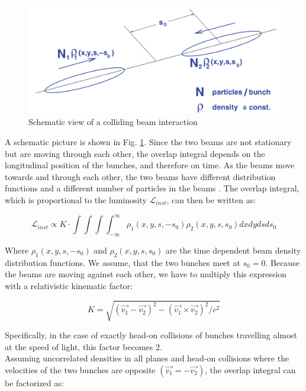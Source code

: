 \begin{center}
  \begin{figure}[h!]
    \centering
\includegraphics[scale=.25]{Chapter1/luminosity.png} 
 \caption[Colliding beam interaction]{Schematic view of a colliding beam interaction\cite{concept_of_luminosity}}
    \label{luminosity}
  \end{figure}
\end{center}

A schematic picture is shown in Fig. \ref{luminosity}. Since the two beams are not stationary but are moving through each other, the overlap integral depends on the longitudinal position of the bunches, and therefore on time. As the beams move towards and through each other, the two beams have different distribution functions and a different number of particles in the beams \cite{concept_of_luminosity}. The overlap integral, which is proportional to the luminosity $\mathcal{L}_{inst}$, can then be written as:
 
\begin{equation}
  \mathcal{L}_{inst}\propto K\cdot \int\int\int \int_{-\infty}^{\infty} \rho_{1}(x,y,s,-s_{0}) \rho_{2}(x,y,s,s_{0})dxdydsds_{0}
    \label{lumi_1}
\end{equation}
 
Where  $\rho_{1}(x,y,s,-s_{0})$ and $\rho_{2}(x,y,s,s_{0})$ are the time dependent beam density distribution functions. We assume, that the two bunches meet at $s_{0} = 0$. Because the beams are moving against each other, we have to multiply this expression with a relativistic kinematic factor:

\begin{equation}
 K = \sqrt{(\vec{v_{1}}-\vec{v_{2}})^{2}-(\vec{v_{1}}\times \vec{v_{2}})^{2}/c^{2}}
    \label{kinematic}
\end{equation}

Specifically, in the case of exactly head-on collisions of bunches travelling almost at the speed of light, this factor becomes 2.\\
Assuming uncorrelated densities in all planes and head-on collisions where the velocities of the two bunches are opposite $(\vec{v_{1}}=-\vec{v_{2}})$, the overlap integral can be factorized as:

